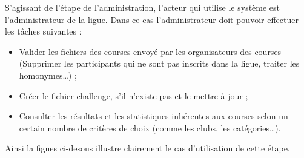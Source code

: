 \documentclass[12pt,a4paper]{report}
\begin{document}
S’agissant de l’étape de l’administration, l’acteur qui utilise le système est l’administrateur de la ligue. Dans ce cas l’administrateur doit pouvoir effectuer les tâches suivantes :
\begin{itemize} 
\item Valider les fichiers des courses envoyé par les organisateurs des courses (Supprimer les participants qui ne sont pas inscrits dans la ligue, traiter les homonymes…) ;
\item Créer le fichier challenge, s’il n’existe pas et le mettre à jour ;
\item  Consulter les résultats et les statistiques inhérentes aux courses selon un certain nombre de critères de choix (comme les clubs, les catégories…).
\end{itemize} 
Ainsi la figues ci-desous  illustre clairement le cas d’utilisation de cette étape.
\end{document}
